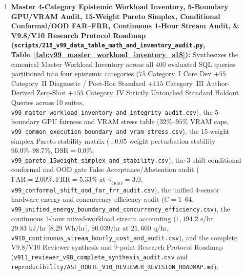\documentclass[10pt,a4paper]{article}
\begin{document}
\begin{enumerate}[leftmargin=1.5em,itemsep=2pt]
    \item \textbf{Master 4-Category Epistemic Workload Inventory, 5-Boundary GPU/VRAM Audit, 15-Weight Pareto Simplex, Conditional Conformal/OOD FAR--FRR, Continuous 1-Hour Stream Audit, \& V9.8/V10 Research Protocol Roadmap (\texttt{scripts/218\_v99\_data\_table\_math\_and\_inventory\_audit.py}, Table~\ref{tab:v99_master_workload_inventory_s18}):} Synthesizes the canonical Master Workload Inventory across all $400$ evaluated SQL queries partitioned into four epistemic categories ($75$ Category~I Core Dev $+ 55$ Category~II Diagnostic / Post-Hoc Standard $+ 115$ Category~III Author-Derived Zero-Shot $+ 155$ Category~IV Strictly Untouched Standard Holdout Queries across 10 suites, \texttt{v99\_master\_workload\_inventory\_and\_integrity\_audit.csv}), the 5-boundary GPU fairness and VRAM stress table ($32\%\text{--}95\%$ VRAM caps, \texttt{v99\_common\_execution\_boundary\_and\_vram\_stress.csv}), the 15-weight simplex Pareto stability matrix ($\pm 0.05$ weight perturbation stability $96.0\%\text{--}98.7\%$, $\text{DSR}=0.0\%$, \texttt{v99\_pareto\_15weight\_simplex\_and\_stability.csv}), the 3-shift conditional conformal and OOD gate False Acceptance/Abstention audit ($\text{FAR}=2.00\%, \text{FRR}=5.33\%$ at $\gamma_{\text{OOD}}=3.0$, \texttt{v99\_conformal\_shift\_ood\_far\_frr\_audit.csv}), the unified 4-sensor hardware energy and concurrency efficiency audit ($C=1\text{--}64$, \texttt{v99\_unified\_energy\_boundary\_and\_concurrency\_efficiency.csv}), the continuous 1-hour mixed-workload stream accounting ($1{,}194.2\text{ s/hr}$, $29.83\text{ kJ/hr}$ [$8.29\text{ Wh/hr}$], $\$0.039\text{/hr}$ at $21{,}600\text{ q/hr}$, \texttt{v910\_continuous\_stream\_hourly\_cost\_and\_audit.csv}), and the complete V9.8/V10 Reviewer synthesis and 9-point Research Protocol Roadmap (\texttt{v911\_reviewer\_v98\_complete\_synthesis\_audit.csv} and \texttt{reproducibility/AST\_ROUTE\_V10\_REVIEWER\_REVISION\_ROADMAP.md}).
\end{enumerate}
\end{document}
